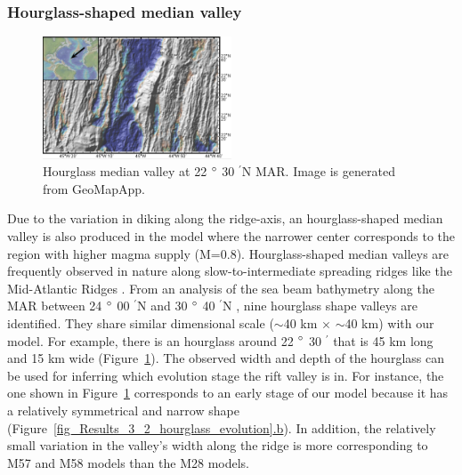 \subsubsection{Hourglass-shaped median valley}

\begin{figure}[h]
  \centering
    \includegraphics[width=0.5\textwidth]{./Figures/fig_Discussion_Observation_4_hourglass_22N_MAR.eps}
  \caption[Hourglass median valley at 22 $\degree$ 30 $^{\prime}$N MAR.]{Hourglass median valley at 22 $\degree$ 30 $^{\prime}$N MAR. Image is generated from GeoMapApp.}
 \label{fig_Discussion_Observation_4_hourglass_22N_MAR}
\end{figure}   

Due to the variation in diking along the ridge-axis, an hourglass-shaped median valley is also produced in the model where the narrower center corresponds to the region with higher magma supply (M=$0.8$). Hourglass-shaped median valleys are frequently observed in nature along slow-to-intermediate spreading ridges like the Mid-Atlantic Ridges \citep{Sempere1993}. From an analysis of the sea beam bathymetry along the MAR between 24 $\degree$ 00 $^{\prime}$N and 30 $\degree$ 40 $^{\prime}$N \citep{Sempere1993}, nine hourglass shape valleys are identified. They share similar dimensional scale ($\sim$40 km $\times$ $\sim$40 km) with our model. For example, there is an hourglass around 22 $\degree$ 30 $^{\prime}$ that is 45 km long and 15 km wide (Figure~\hyperref[fig_Discussion_Observation_4_hourglass_22N_MAR]{\ref{fig_Discussion_Observation_4_hourglass_22N_MAR}}). The observed width and depth of the hourglass can be used for inferring which evolution stage the rift valley is in. For instance, the one shown in Figure~\hyperref[fig_Discussion_Observation_4_hourglass_22N_MAR]{\ref{fig_Discussion_Observation_4_hourglass_22N_MAR}} corresponds to an early stage of our model because it has a relatively symmetrical and narrow shape (Figure~\hyperref[fig_Results_3_2_hourglass_evolution]{\ref{fig_Results_3_2_hourglass_evolution}.b}). In addition, the relatively small variation in the valley's width along the ridge is more corresponding to M57 and M58 models than the M28 models. 

